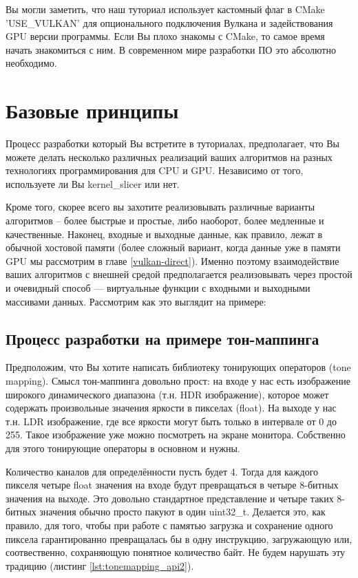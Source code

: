 \documentclass[11pt,fleqn,english,russian]{report} %
\begin{document}
\begin{remark} 
Вы могли заметить, что наш туториал использует кастомный флаг в CMake 'USE\_VULKAN' для опционального подключения Вулкана и задействования GPU версии программы. Если Вы плохо знакомы с CMake, то самое время начать знакомиться с ним. В современном мире разработки ПО это абсолютно необходимо. 
\end{remark}

\chapter{Базовые принципы}

Процесс разработки который Вы встретите в туториалах, предполагает, что Вы можете делать несколько различных реализаций ваших алгоритмов на разных технологиях программирования для CPU и GPU. Независимо от того, используете ли Вы kernel\_slicer или нет. 

Кроме того, скорее всего вы захотите реализовывать различные варианты алгоритмов -- более быстрые и простые, либо наоборот, более медленные и качественные. Наконец, входные и выходные данные, как правило, лежат в обычной хостовой памяти (более сложный вариант, когда данные уже в памяти GPU мы рассмотрим в главе \ref{vulkan-direct}). Именно поэтому взаимодействие ваших алгоритмов с внешней средой предполагается реализовывать через простой и очевидный способ --- виртуальные функции с входными и выходными массивами данных. Рассмотрим как это выглядит на примере: 

\section{Процесс разработки на примере тон-маппинга}\label{tm_example}

Предположим, что Вы хотите написать библиотеку тонирующих операторов (tone mapping). Смысл тон-маппинга довольно прост: на входе у нас есть изображение широкого динамического диапазона (т.н. HDR изображение), которое может содержать произвольные значения яркости в пикселах (float). На выходе у нас т.н. LDR изображение, где все яркости могут быть только в интервале от 0 до 255. Такое изображение уже можно посмотреть на экране монитора. Собственно для этого тонирующие операторы в основном и нужны.

Количество каналов для определённости пусть будет 4. Тогда для каждого пикселя четыре float значения на входе будут превращаться в четыре 8-битных значения на выходе. Это довольно стандартное представление и четыре таких 8-битных значения обычно просто пакуют в один uint32\_t. Делается это, как правило, для того, чтобы при работе с памятью загрузка и сохранение одного пиксела гарантированно превращалась бы в одну инструкцию, загружающую или, соотвественно, сохраняющую понятное количество байт. Не будем нарушать эту традицию (листинг \ref{lst:tonemapping_api2}).
\end{document}
